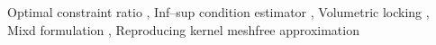 \begin{frontmatter}
\begin{abstract}
\end{abstract}

\begin{keyword}
    Optimal constraint ratio
    \sep
    Inf--sup condition estimator
    \sep
    Volumetric locking
    \sep
    Mixd formulation
    \sep
    Reproducing kernel meshfree approximation
\end{keyword}

\end{frontmatter}
